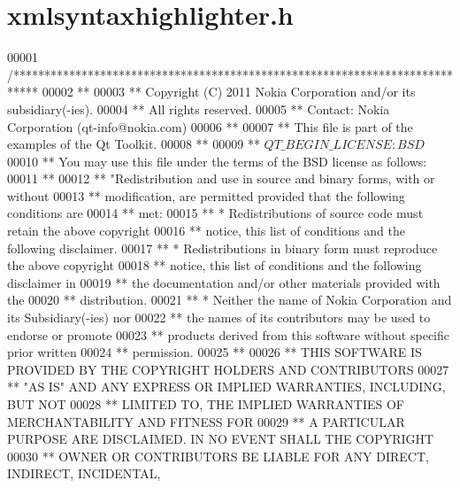 \hypertarget{xmlsyntaxhighlighter_8h_source}{\section{xmlsyntaxhighlighter.\-h}
}

\begin{DoxyCode}
00001 \textcolor{comment}{/****************************************************************************}
00002 \textcolor{comment}{**}
00003 \textcolor{comment}{** Copyright (C) 2011 Nokia Corporation and/or its subsidiary(-ies).}
00004 \textcolor{comment}{** All rights reserved.}
00005 \textcolor{comment}{** Contact: Nokia Corporation (qt-info@nokia.com)}
00006 \textcolor{comment}{**}
00007 \textcolor{comment}{** This file is part of the examples of the Qt Toolkit.}
00008 \textcolor{comment}{**}
00009 \textcolor{comment}{** $QT\_BEGIN\_LICENSE:BSD$}
00010 \textcolor{comment}{** You may use this file under the terms of the BSD license as follows:}
00011 \textcolor{comment}{**}
00012 \textcolor{comment}{** "Redistribution and use in source and binary forms, with or without}
00013 \textcolor{comment}{** modification, are permitted provided that the following conditions are}
00014 \textcolor{comment}{** met:}
00015 \textcolor{comment}{**   * Redistributions of source code must retain the above copyright}
00016 \textcolor{comment}{**     notice, this list of conditions and the following disclaimer.}
00017 \textcolor{comment}{**   * Redistributions in binary form must reproduce the above copyright}
00018 \textcolor{comment}{**     notice, this list of conditions and the following disclaimer in}
00019 \textcolor{comment}{**     the documentation and/or other materials provided with the}
00020 \textcolor{comment}{**     distribution.}
00021 \textcolor{comment}{**   * Neither the name of Nokia Corporation and its Subsidiary(-ies) nor}
00022 \textcolor{comment}{**     the names of its contributors may be used to endorse or promote}
00023 \textcolor{comment}{**     products derived from this software without specific prior written}
00024 \textcolor{comment}{**     permission.}
00025 \textcolor{comment}{**}
00026 \textcolor{comment}{** THIS SOFTWARE IS PROVIDED BY THE COPYRIGHT HOLDERS AND CONTRIBUTORS}
00027 \textcolor{comment}{** "AS IS" AND ANY EXPRESS OR IMPLIED WARRANTIES, INCLUDING, BUT NOT}
00028 \textcolor{comment}{** LIMITED TO, THE IMPLIED WARRANTIES OF MERCHANTABILITY AND FITNESS FOR}
00029 \textcolor{comment}{** A PARTICULAR PURPOSE ARE DISCLAIMED. IN NO EVENT SHALL THE COPYRIGHT}
00030 \textcolor{comment}{** OWNER OR CONTRIBUTORS BE LIABLE FOR ANY DIRECT, INDIRECT, INCIDENTAL,}

\end{DoxyCode}

